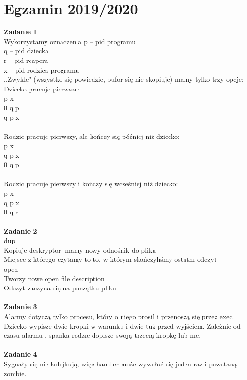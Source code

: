\documentclass[12pt, a4paper, polish, openany]{book}
\begin{document}
\section{Egzamin 2019/2020}
\textbf{Zadanie 1} \\
Wykorzystamy oznaczenia
p – pid programu \\
q – pid dziecka \\
r – pid reapera \\
x – pid rodzica programu \\
,,Zwykle" (wszystko się powiedzie, bufor się nie skopiuje) mamy tylko trzy opcje: \\
Dziecko pracuje pierwsze: \\
p x \\
0 q p \\
q p x \\\\
Rodzic pracuje pierwszy, ale kończy się później niż dziecko: \\
p x \\
q p x \\
0 q p \\\\
Rodzic pracuje pierwszy i kończy się wcześniej niż dziecko: \\
p x \\
q p x \\
0 q r \\\\
\textbf{Zadanie 2} \\
dup \\
Kopiuje deskryptor, mamy nowy odnośnik do pliku \\
Miejsce z którego czytamy to to, w którym skończyliśmy ostatni odczyt \\
open \\
Tworzy nowe open file description \\
Odczyt zaczyna się na początku pliku \\\\
\textbf{Zadanie 3} \\
Alarmy dotyczą tylko procesu, który o niego prosił i przenoszą się przez exec. \\
Dziecko wypisze dwie kropki w warunku i dwie tuż przed wyjściem. Zależnie od czasu alarmu i spanka rodzic dopisze swoją trzecią kropkę lub nie. \\\\
\textbf{Zadanie 4} \\
Sygnały się nie kolejkują, więc handler może wywołać się jeden raz i powstaną zombie. \\\\
\end{document}
